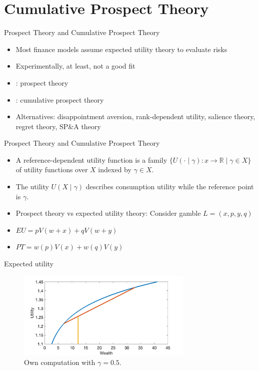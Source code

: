 \section{Cumulative Prospect Theory}
\begin{frame}{Prospect Theory and Cumulative Prospect Theory}
    \begin{itemize}
        \item Most finance models assume expected utility theory to evaluate risks\bigskip
        \item Experimentally, at least, not a good fit\bigskip
        \item \citet{KahnemanTversky1979}: prospect theory\bigskip
        \item \citet{TverskyKahneman1992}: cumulative prospect theory\bigskip
        \item Alternatives: disappointment aversion, rank-dependent utility, salience theory, regret theory, SP\&A theory\bigskip
    \end{itemize}
\end{frame}


\begin{frame}{Prospect Theory and Cumulative Prospect Theory}
    \begin{itemize}
        \item A reference-dependent utility function is a family $\{U(\cdot \mid \gamma):x \longrightarrow \mathbb{R} \mid \gamma \in X\}$  of utility functions over $X$ indexed by $\gamma \in X$.\bigskip
        \item The utility $U(X \mid \gamma)$ describes consumption utility while the reference point is $\gamma$.\bigskip
        \item Prospect theory vs expected utility theory: Consider gamble $L = (x, p, y, q)$\bigskip
        \item $EU = p V(w + x) + q V(w + y)$\bigskip
        \item $PT = w(p) V(x) + w(q) V(y)$\bigskip
\end{itemize}
\end{frame}


\begin{frame}{Expected utility}
    \begin{figure}
\centering
\includegraphics[width= 0.75\textwidth]{expected_utility}
\caption{Own computation with $\gamma =0.5$.}
    \end{figure}
\end{frame}

